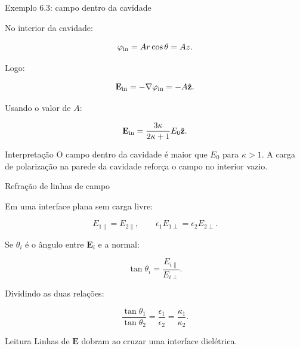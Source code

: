 \documentclass[aspectratio=169]{beamer}
\begin{document}
\begin{frame}{Exemplo 6.3: campo dentro da cavidade}

\small

No interior da cavidade:

\[
\varphi_{\rm in}=Ar\cos\theta=Az.
\]

Logo:

\[
\mathbf E_{\rm in}
=
-\nabla\varphi_{\rm in}
=
-A\hat{\mathbf z}.
\]

Usando o valor de \(A\):

\begin{eqbox}
\begin{equation}
\mathbf E_{\rm in}
=
\frac{3\kappa}{2\kappa+1}
E_0\hat{\mathbf z}.
\end{equation}
\end{eqbox}

\begin{alertblock}{Interpretação}
O campo dentro da cavidade é maior que \(E_0\) para \(\kappa>1\). A carga de
polarização na parede da cavidade reforça o campo no interior vazio.
\end{alertblock}

\end{frame}

\begin{frame}{Refração de linhas de campo}

\small

Em uma interface plana sem carga livre:

\[
E_{1\parallel}=E_{2\parallel},
\qquad
\epsilon_1 E_{1\perp}=\epsilon_2 E_{2\perp}.
\]

Se \(\theta_i\) é o ângulo entre \(\mathbf E_i\) e a normal:

\[
\tan\theta_i=\frac{E_{i\parallel}}{E_{i\perp}}.
\]

Dividindo as duas relações:

\begin{eqbox}
\begin{equation}
\frac{\tan\theta_1}{\tan\theta_2}
=
\frac{\epsilon_1}{\epsilon_2}
=
\frac{\kappa_1}{\kappa_2}.
\tag{6.68}
\label{eq:refracao-linhas-E}
\end{equation}
\end{eqbox}

\begin{alertblock}{Leitura}
Linhas de \(\mathbf E\) dobram ao cruzar uma interface dielétrica.
\end{alertblock}

\end{frame}
\end{document}
